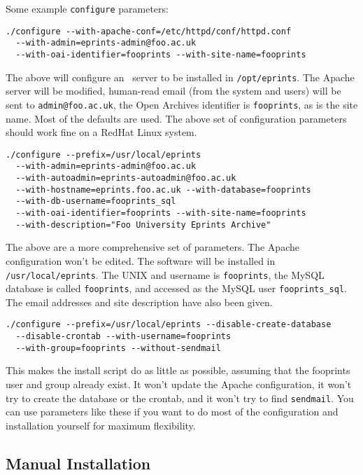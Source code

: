 Some example {\tt configure} parameters:

\begin{verbatim}
./configure --with-apache-conf=/etc/httpd/conf/httpd.conf
  --with-admin=eprints-admin@foo.ac.uk
  --with-oai-identifier=fooprints --with-site-name=fooprints
\end{verbatim}

The above will configure an \eprints\ server to be installed in {\tt /opt/eprints}. The Apache server will be modified, human-read email (from the system and users) will be sent to {\tt admin@foo.ac.uk}, the Open Archives identifier is {\tt fooprints}, as is the site name. Most of the defaults are used. The above set of configuration parameters should work fine on a RedHat Linux system.

\begin{verbatim}
./configure --prefix=/usr/local/eprints
  --with-admin=eprints-admin@foo.ac.uk
  --with-autoadmin=eprints-autoadmin@foo.ac.uk
  --with-hostname=eprints.foo.ac.uk --with-database=fooprints
  --with-db-username=fooprints_sql
  --with-oai-identifier=fooprints --with-site-name=fooprints
  --with-description="Foo University Eprints Archive"
\end{verbatim}

The above are a more comprehensive set of parameters. The Apache configuration won't be edited. The software will be installed in {\tt /usr/local/eprints}. The UNIX and username is {\tt fooprints}, the MySQL database is called {\tt fooprints}, and accessed as the MySQL user {\tt fooprints\_sql}. The email addresses and site description have also been given.

\begin{verbatim}
./configure --prefix=/usr/local/eprints --disable-create-database
  --disable-crontab --with-username=fooprints
  --with-group=fooprints --without-sendmail
\end{verbatim}

This makes the install script do as little as possible, assuming that the fooprints user and group already exist. It won't update the Apache configuration, it won't try to create the database or the crontab, and it won't try to find {\tt sendmail}. You can use parameters like these if you want to do most of the configuration and installation yourself for maximum flexibility.


\subsection{Manual Installation}
\label{install_manual}

